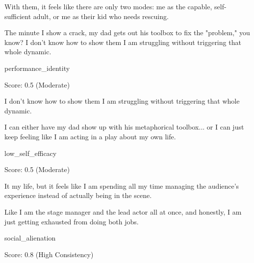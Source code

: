\begin{tcolorbox}[
    colback=gray!5, colframe=gray!50, arc=2mm, boxrule=0.5pt,
    left=5pt, right=5pt, enhanced, drop shadow, breakable
]
\begin{description}[leftmargin=3.5cm, labelwidth=3.2cm, font=\bfseries, nosep]
    \item[Belief] With them, it feels like there are only two modes: me as the capable, self-sufficient adult, or me as their kid who needs rescuing.
    \item[Action] The minute I show a crack, my dad gets out his toolbox to fix the "problem," you know? I don't know how to show them I am struggling without triggering that whole dynamic.
    \item[Belief Type] performance\_identity
    \item[Metrics] Score: 0.5 (Moderate)
\end{description}
\end{tcolorbox}

\begin{tcolorbox}[
    colback=gray!5, colframe=gray!50, arc=2mm, boxrule=0.5pt,
    left=5pt, right=5pt, enhanced, drop shadow, breakable
]
\begin{description}[leftmargin=3.5cm, labelwidth=3.2cm, font=\bfseries, nosep]
    \item[Belief] I don't know how to show them I am struggling without triggering that whole dynamic.
    \item[Action] I can either have my dad show up with his metaphorical toolbox... or I can just keep feeling like I am acting in a play about my own life.
    \item[Belief Type] low\_self\_efficacy
    \item[Metrics] Score: 0.5 (Moderate)
\end{description}
\end{tcolorbox}

\begin{tcolorbox}[
    colback=gray!5, colframe=gray!50, arc=2mm, boxrule=0.5pt,
    left=5pt, right=5pt, enhanced, drop shadow, breakable
]
\begin{description}[leftmargin=3.5cm, labelwidth=3.2cm, font=\bfseries, nosep]
    \item[Belief] It my life, but it feels like I am spending all my time managing the audience's experience instead of actually being in the scene.
    \item[Action] Like I am the stage manager and the lead actor all at once, and honestly, I am just getting exhausted from doing both jobs.
    \item[Belief Type] social\_alienation
    \item[Metrics] Score: 0.8 (High Consistency)
\end{description}
\end{tcolorbox}

